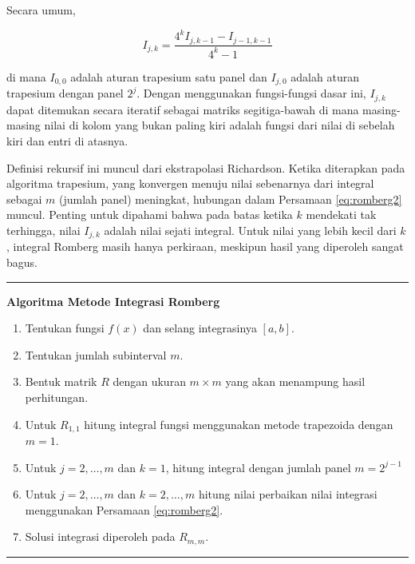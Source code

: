 \documentclass[
]{book}
\providecommand{\tightlist}{%
  \setlength{\itemsep}{0pt}\setlength{\parskip}{0pt}}
\theoremstyle{definition}
\theoremstyle{definition}
\theoremstyle{definition}
\theoremstyle{definition}
\theoremstyle{remark}
\begin{document}
Secara umum,

\begin{equation}
I_{j,k}=\frac{4^k I_{j,k-1}-I_{j-1,k-1}}{4^k-1}
  \label{eq:romberg2}
\end{equation}

di mana \(I_{0, 0}\) adalah aturan trapesium satu panel dan \(I_{j, 0}\) adalah aturan trapesium dengan panel \(2^j\). Dengan menggunakan fungsi-fungsi dasar ini, \(I_{j, k}\) dapat ditemukan secara iteratif sebagai matriks segitiga-bawah di mana masing-masing nilai di kolom yang bukan paling kiri adalah fungsi dari nilai di sebelah kiri dan entri di atasnya.

Definisi rekursif ini muncul dari ekstrapolasi Richardson. Ketika diterapkan pada algoritma trapesium, yang konvergen menuju nilai sebenarnya dari integral sebagai \(m\) (jumlah panel) meningkat, hubungan dalam Persamaan \eqref{eq:romberg2} muncul. Penting untuk dipahami bahwa pada batas ketika \(k\) mendekati tak terhingga, nilai \(I_{j, k}\) adalah nilai sejati integral. Untuk nilai yang lebih kecil dari \(k\), integral Romberg masih hanya perkiraan, meskipun hasil yang diperoleh sangat bagus.

\begin{center}\rule{0.5\linewidth}{0.5pt}\end{center}

\textbf{Algoritma Metode Integrasi Romberg}

\begin{enumerate}
\def\labelenumi{\arabic{enumi}.}
\tightlist
\item
  Tentukan fungsi \(f\left(x\right)\) dan selang integrasinya \(\left[a,b\right]\).
\item
  Tentukan jumlah subinterval \(m\).
\item
  Bentuk matrik \(R\) dengan ukuran \(m\times m\) yang akan menampung hasil perhitungan.
\item
  Untuk \(R_{1,1}\) hitung integral fungsi menggunakan metode trapezoida dengan \(m=1\).
\item
  Untuk \(j=2,\dots,m\) dan \(k=1\), hitung integral dengan jumlah panel \(m=2^{j-1}\)
\item
  Untuk \(j=2,\dots,m\) dan \(k=2,\dots,m\) hitung nilai perbaikan nilai integrasi menggunakan Persamaan \eqref{eq:romberg2}.
\item
  Solusi integrasi diperoleh pada \(R_{m,m}\).
\end{enumerate}

\begin{center}\rule{0.5\linewidth}{0.5pt}\end{center}
\end{document}
